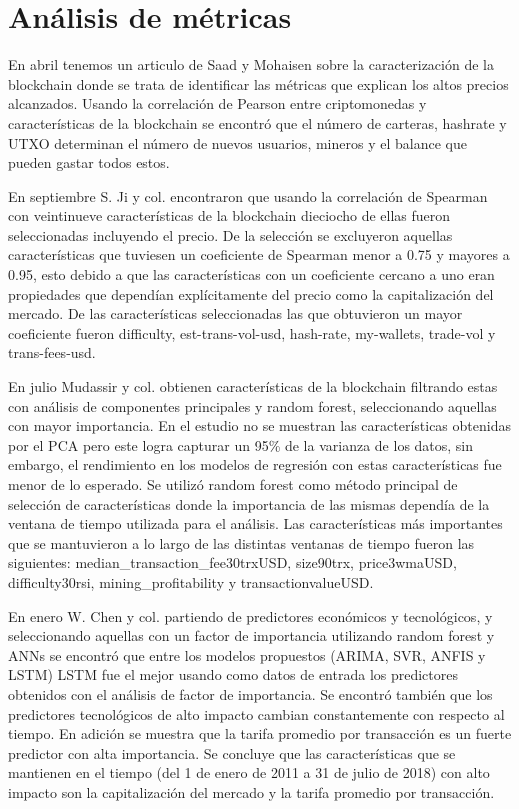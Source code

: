 \section{Análisis de métricas} 

En abril tenemos un articulo de Saad y Mohaisen \parencite*{saadCharacterizingBlockchainbasedCryptocurrencies2018} sobre la caracterización de la blockchain donde se trata de identificar las métricas que explican los altos precios alcanzados. Usando la correlación de Pearson entre criptomonedas y características de la blockchain se encontró que el número de carteras, hashrate y UTXO determinan el número de nuevos usuarios, mineros y el balance que pueden gastar todos estos. 

En septiembre S. Ji y col.  \parencite*{jiComparativeStudyBitcoin2019} encontraron que usando la correlación de Spearman con veintinueve características de la blockchain dieciocho de ellas fueron seleccionadas incluyendo el precio. De la selección se excluyeron aquellas características que tuviesen un coeficiente de Spearman menor a 0.75 y mayores a 0.95, esto debido a que las características con un coeficiente cercano a uno eran propiedades que dependían explícitamente del precio como la capitalización del mercado. De las características seleccionadas las que obtuvieron un mayor coeficiente fueron difficulty, est-trans-vol-usd, hash-rate, my-wallets, trade-vol y trans-fees-usd.

En julio Mudassir y col. \parencite*{mudassirTimeseriesForecastingBitcoin2020} obtienen características de la blockchain filtrando estas con análisis de componentes principales y random forest, seleccionando aquellas con mayor importancia. En el estudio no se muestran las características obtenidas por el PCA pero este logra capturar un 95\% de la varianza de los datos, sin embargo, el rendimiento en los modelos de regresión con estas características fue menor de lo esperado.
Se utilizó random forest como método principal de selección de características donde la importancia de las mismas dependía de la ventana de tiempo utilizada para el análisis. Las características más importantes que se mantuvieron a lo largo de las distintas ventanas de tiempo fueron las siguientes: median\_transaction\_fee30trxUSD, size90trx, price3wmaUSD, difficulty30rsi, mining\_profitability y transactionvalueUSD. 

En enero W. Chen y col. \parencite*{chenMachineLearningModel2021} partiendo de predictores económicos y tecnológicos, y seleccionando aquellas con un factor de importancia utilizando random forest y ANNs se encontró que entre los modelos propuestos (ARIMA, SVR, ANFIS y LSTM) LSTM fue el mejor usando como datos de entrada los predictores obtenidos con el análisis de factor de importancia. Se encontró también que los predictores tecnológicos de alto impacto cambian constantemente con respecto al tiempo. En adición se muestra que la tarifa promedio por transacción es un fuerte predictor con alta importancia. Se concluye que las características que se mantienen en el tiempo (del 1 de enero de 2011 a 31 de julio de 2018) con alto impacto son la capitalización del mercado y la tarifa promedio por transacción.


